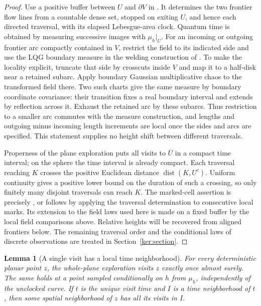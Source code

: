 \documentclass[11pt]{article}
\numberwithin{equation}{section}
\newtheorem{lemma}[theorem]{Lemma}
\theoremstyle{definition}
\theoremstyle{remark}
\newcommand{\1}{\mathbf 1}
\begin{document}
\begin{proof}
Use a positive buffer between $U$ and $\partial V$ in
\cite[Lemma 2.4]{GwynneMillerSheffieldHarmonic}.  It determines the two
frontier flow lines from a countable dense set, stopped on exiting $U$,
and hence each directed traversal, with its elapsed Lebesgue-area clock.
Quantum time is obtained by measuring successive images with $\mu_h|_U$.
For an incoming or outgoing frontier arc compactly contained in $V$,
restrict the field to its indicated side and use the LQG boundary measure
in the welding construction of \cite{DMSMating}.  To make the locality
explicit, truncate that side by crosscuts inside $V$ and map it to a
half-disk near a retained subarc.  Apply boundary Gaussian multiplicative
chaos to the transformed field there.  Two such charts give the same
measure by boundary coordinate covariance: their transition fixes a
real boundary interval and extends by reflection across it.  Exhaust
the retained arc by these subarcs.  Thus restriction to a smaller arc
commutes with the measure construction, and lengths and outgoing minus
incoming length increments are local once the sides and arcs are
specified.  This statement supplies no height shift between different
traversals.

Properness of the plane exploration puts all visits to $\overline U$ in
a compact time interval; on the sphere the time interval is already
compact.  Each traversal reaching $K$ crosses the positive Euclidean
distance $\operatorname{dist}(K,U^c)$.  Uniform continuity gives a positive lower bound
on the duration of such a crossing, so only finitely many disjoint
traversals can reach $K$.  The marked-cell assertion is precisely
\cite[Lemma 3.7]{ContrerasHipGwynneCurvature}, or follows by applying the
traversal determination to consecutive local marks.  Its extension to
the field laws used here is made on a fixed buffer by the local field
comparisons above.  Relative heights will be recovered from aligned
frontiers below.  The remaining traversal order and the conditional
laws of discrete observations are treated in Section~\ref{ker:section}.
\end{proof}

\begin{lemma}[A single visit has a local time neighborhood]
\label{enc:single-visit}
For every deterministic planar point $z$, the whole-plane exploration
visits $z$ exactly once almost surely.  The same holds at a point sampled
conditionally on $h$ from $\mu_h$, independently of the unclocked curve.  If $t$ is the unique
visit time and $I$ is a time neighborhood of $t$, then some spatial
neighborhood of $z$ has all its visits in $I$.
\end{lemma}
\end{document}
